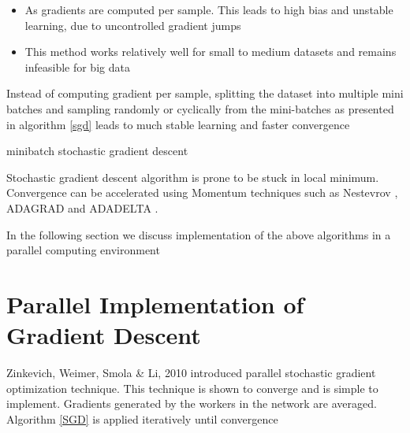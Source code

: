 \documentclass[sigconf]{acmart}
\begin{document}
\begin{itemize}

\item As gradients are computed per sample. This leads to high bias and unstable learning, due to uncontrolled gradient jumps

\item This method works relatively well for small to medium datasets and remains infeasible for big data

\end{itemize}

Instead of computing gradient per sample, splitting the dataset into multiple mini batches \cite{Bottou2010} and sampling randomly or cyclically from the mini-batches as presented in algorithm \ref{sgd} leads to much stable learning and faster convergence

\begin{algorithm}

\caption{minibatch stochastic gradient descent} \label{sgd}

\begin{algorithmic}[1] 
\EndWhile
\end{algorithmic}

\end{algorithm}

Stochastic gradient descent algorithm is prone to be stuck in local minimum. Convergence can be accelerated using Momentum techniques such as Nestevrov \cite{Duchi}, ADAGRAD \cite{Duchi} and ADADELTA \cite{DBLP:journals/corr/abs-1212-5701}.

In the following section we discuss implementation of the above algorithms in a parallel computing environment
  
\section{Parallel Implementation of Gradient Descent} \label{deploy}

Zinkevich, Weimer,  Smola \& Li, 2010 \cite{NIPS2010-4006} introduced parallel stochastic gradient optimization technique. This technique is shown to converge and is simple to implement.  Gradients generated by the workers in the network are averaged. Algorithm \ref{SGD} is applied iteratively until convergence 
\end{document}
